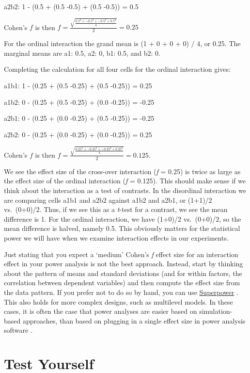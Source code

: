 \documentclass[
  oneside]{krantz}
\begin{document}
a2b2: 1 - (0.5 + (0.5 -0.5) + (0.5 -0.5)) = 0.5

Cohen's \(f\) is then \(f = \frac { \sqrt { \frac { 0.5^2 +-0.5^2 + -0.5^2 + 0.5^2 } { 4 } }}{ 2 } = 0.25\)

For the ordinal interaction the grand mean is (1 + 0 + 0 + 0) / 4, or 0.25. The marginal means are a1: 0.5, a2: 0, b1: 0.5, and b2: 0.

Completing the calculation for all four cells for the ordinal interaction gives:

a1b1: 1 - (0.25 + (0.5 -0.25) + (0.5 -0.25)) = 0.25

a1b2: 0 - (0.25 + (0.5 -0.25) + (0.0 -0.25)) = -0.25

a2b1: 0 - (0.25 + (0.0 -0.25) + (0.5 -0.25)) = -0.25

a2b2: 0 - (0.25 + (0.0 -0.25) + (0.0 -0.25)) = 0.25

Cohen's \(f\) is then \(f = \frac { \sqrt { \frac { 0.25^2 +-0.25^2 + -0.25^2 + 0.25^2 } { 4 } }}{ 2 } = 0.125\).

We see the effect size of the cross-over interaction (\emph{f} = 0.25) is twice as large as the effect size of the ordinal interaction (\emph{f} = 0.125). This should make sense if we think about the interaction as a test of contrasts. In the disordinal interaction we are comparing cells a1b1 and a2b2 against a1b2 and a2b1, or (1+1)/2 vs.~(0+0)/2. Thus, if we see this as a \emph{t}-test for a contrast, we see the mean difference is 1. For the ordinal interaction, we have (1+0)/2 vs.~(0+0)/2, so the mean difference is halved, namely 0.5. This obviously matters for the statistical power we will have when we examine interaction effects in our experiments.

Just stating that you expect a `medium' Cohen's \emph{f} effect size for an interaction effect in your power analysis is not the best approach. Instead, start by thinking about the pattern of means and standard deviations (and for within factors, the correlation between dependent variables) and then compute the effect size from the data pattern. If you prefer not to do so by hand, you can use \href{https://aaroncaldwell.us/SuperpowerBook/}{Superpower} \citep{lakens_simulation-based_2021}. This also holds for more complex designs, such as multilevel models. In these cases, it is often the case that power analyses are easier based on simulation-based approaches, than based on plugging in a single effect size in power analysis software \citep{debruine_understanding_2021}.

\hypertarget{test-yourself-4}{%
\section{Test Yourself}\label{test-yourself-4}}
\end{document}
